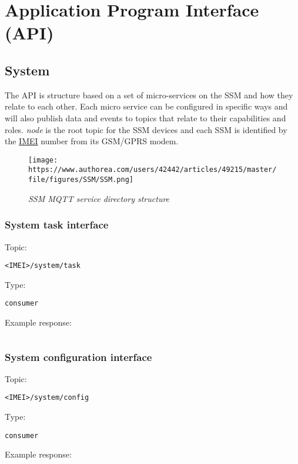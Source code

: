 \section{Application Program Interface (API)}
\subsection{System}
The API is structure based on a set of micro-services on the SSM and how they relate to each other. Each micro service can be configured in specific ways and will also publish data and events to topics that relate to their capabilities and roles. \textit{node} is the root topic for the SSM devices and each SSM is identified by the \href{http://www.gsma.com/technicalprojects/faq/what-is-an-imei}{IMEI} number from its GSM/GPRS modem.


\begin{figure}[h]
    \centering
    \texttt{[image: https://www.authorea.com/users/42442/articles/49215/master/file/figures/SSM/SSM.png]}
    \caption{\textit{SSM MQTT service directory structure}}
\end{figure}
\subsubsection{System task interface}

Topic:
\begin{lstlisting}<IMEI>/system/task\end{lstlisting}
Type:
\begin{lstlisting}consumer\end{lstlisting}
Example response:
\begin{lstlisting}\end{lstlisting}

\subsubsection{System configuration interface}

Topic:
\begin{lstlisting}<IMEI>/system/config\end{lstlisting}
Type:
\begin{lstlisting}consumer\end{lstlisting}
Example response:
\begin{lstlisting}\end{lstlisting}

